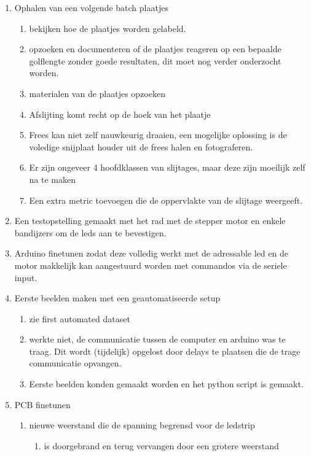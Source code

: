 \documentclass{article}
\begin{document}
\begin{enumerate}[1]
\item Ophalen van een volgende batch plaatjes
	\begin{enumerate}[a]
	\item bekijken hoe de plaatjes worden gelabeld. 
	\item opzoeken en documenteren of de plaatjes reageren op een bepaalde golflengte zonder goede resultaten, dit moet nog verder onderzocht worden.
	\item materialen van de plaatjes opzoeken
	\item Afslijting komt recht op de hoek van het plaatje
	\item Frees kan niet zelf nauwkeurig draaien, een mogelijke oplossing is de voledige snijplaat houder uit de frees halen en fotograferen.
	\item Er zijn ongeveer 4 hoofdklassen van slijtages, maar deze zijn moeilijk zelf na te maken
	\item Een extra metric toevoegen die de oppervlakte van de slijtage weergeeft. 
	\end{enumerate}
\item Een testopstelling gemaakt met het rad met de stepper motor en enkele bandijzers om de leds aan te bevestigen.
\item Arduino finetunen zodat deze volledig werkt met de adressable led en de motor makkelijk kan aangestuurd worden met commandos via de seriele input.
\item Eerste beelden maken met een geautomatiseerde setup
	\begin{enumerate}[a]
	\item zie first automated dataset
	\item werkte niet, de communicatie tussen de computer en arduino was te traag. Dit wordt (tijdelijk) opgelost door delays te plaatsen die de trage communicatie opvangen. 
	\item Eerste beelden konden gemaakt worden en het python script is gemaakt.
	\end{enumerate}
\item PCB finetunen 
	\begin{enumerate}[a]
	\item nieuwe weerstand die de spanning begrensd voor de ledstrip
		\begin{enumerate}[1]
		\item is doorgebrand en terug vervangen door een grotere weerstand
		\end{enumerate}
	\end{enumerate}
\end{enumerate}
\end{document}
